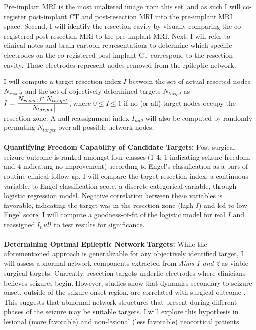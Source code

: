 Pre-implant MRI is the most unaltered image from this set, and as such I will co-register post-implant CT and post-resection MRI into the pre-implant MRI space. Second, I will identify the resection cavity by visually comparing the co-registered post-resection MRI to the pre-implant MRI. Next, I will refer to clinical notes and brain cartoon representations to determine which specific electrodes on the co-registered post-implant CT correspond to the resection cavity. These electrodes represent nodes removed from the epileptic network.

I will compute a target-resection index $I$ between the set of actual resected nodes $N_{resect}$ and the set of objectively determined targets $N_{target}$ as $I=\frac{\displaystyle N_{resect} \cap N_{target}}{\displaystyle \left\vert{N_{target}}\right\vert}$, where $0 \leq I \leq 1$ if no (or all) target nodes occupy the resection zone. A null reassignment index $I_{null}$ will also be computed by randomly permuting $N_{target}$ over all possible network nodes.
~\\
~\\
\textbf{Quantifying Freedom Capability of Candidate Targets:}
Post-surgical seizure outcome is ranked amongst four classes (1-4; 1 indicating seizure freedom, and 4 indicating no improvement) according to Engel's classification \cite{engel1993update} as a part of routine clinical follow-up. I will compare the target-resection index, a continuous variable, to Engel classification score, a discrete categorical variable, through logistic regression model. Negative correlation between these variables is favorable, indicating the target was in the resection zone (high $I$) and led to low Engel score. I will compute a goodness-of-fit of the logistic model for real $I$ and reassigned $I_null$ to test results for significance.
~\\
~\\
\textbf{Determining Optimal Epileptic Network Targets:}
While the aforementioned approach is generalizable for any objectively identified target, I will assess abnormal network components extracted from \textit{Aims 1 and 2} as viable surgical targets. Currently, resection targets underlie electrodes where clinicians believes seizures begin. However, studies show that dynamics secondary to seizure onset, outside of the seizure onset region, are correlated with surgical outcome \cite{kutsy1999ictal}. This suggests that abnormal network structures that present during different phases of the seizure may be suitable targets. I will explore this hypothesis in lesional (more favorable) and non-lesional (less favorable) neocortical patients.


